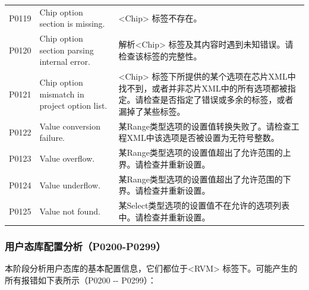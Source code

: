 \begin{xltabular}{\textwidth}{@{}>{\hsize\raggedright\arraybackslash}X>{\hsize\raggedright\arraybackslash}X>{\hsize\raggedright\arraybackslash}X@{}}
P0119 & Chip option section is missing. &
<Chip> 标签不存在。\tabularnewline
P0120 & Chip option section parsing internal error. &
解析<Chip> 标签及其内容时遇到未知错误。请检查该标签的完整性。\tabularnewline
P0121 & Chip option mismatch in project option list. &
<Chip> 标签下所提供的某个选项在芯片XML中找不到，或者并非芯片XML中的所有选项都被指定。请检查是否指定了错误或多余的标签，或者漏掉了某些标签。\tabularnewline
P0122 & Value conversion failure. &
某Range类型选项的设置值转换失败了。请检查工程XML中该选项是否被设置为无符号整数。\tabularnewline
P0123 & Value overflow. &
某Range类型选项的设置值超出了允许范围的上界。请检查并重新设置。\tabularnewline
P0124 & Value underflow. &
某Range类型选项的设置值超出了允许范围的下界。请检查并重新设置。\tabularnewline
P0125 & Value not found. &
某Select类型选项的设置值不在允许的选项列表中。请检查并重新设置。\tabularnewline
\end{xltabular}

\subsubsection{用户态库配置分析（P0200-P0299）}\label{subsubsec:5-6-2-3}

本阶段分析用户态库的基本配置信息，它们都位于<RVM> 标签下。可能产生的所有报错如下表所示（P0200
-\/- P0299）：

